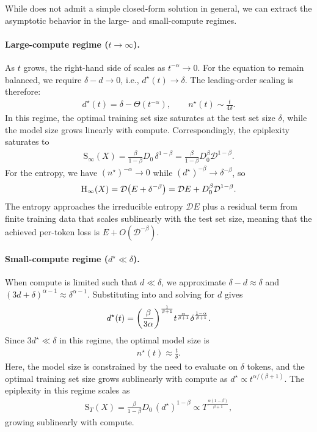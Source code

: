 \documentclass[twoside]{article}
\newcommand{\D}{\mathcal{D}}
\newcommand{\rH}{\mathrm{H}}
\newcommand{\rS}{\mathrm{S}}
\begin{document}
While  does not admit a simple closed-form solution in general, we can extract the asymptotic behavior in the large- and small-compute regimes.

\paragraph{Large-compute regime ($t \to \infty$).} As $t$ grows, the right-hand side of  scales as $t^{-\alpha} \to 0$. For the equation to remain balanced, we require $\delta - d \to 0$, i.e., $d^\star(t) \to \delta$. The leading-order scaling is therefore:
\begin{align}
    d^\star(t) = \delta - \Theta(t^{-\alpha}), \qquad n^\star(t) \sim \frac{t}{4\delta}.
\end{align}
In this regime, the optimal training set size saturates at the test set size $\delta$, while the model size grows linearly with compute. Correspondingly, the epiplexity saturates to
\begin{align}
    \rS_\infty(X) = \frac{\beta}{1-\beta} D_0 \, \delta^{1-\beta} = \frac{\beta}{1-\beta} D_0^{\beta} \mathcal{D}^{1-\beta}.
\end{align}
For the entropy, we have $(n^\star)^{-\alpha} \to 0$ while $(d^\star)^{-\beta} \to \delta^{-\beta}$, so
\begin{align}
    \rH_\infty(X) = \mathcal{D} \qty( E + \delta^{-\beta} ) = \mathcal{D} E + D_0^{\beta} \mathcal{D}^{1-\beta}.
\end{align}
The entropy approaches the irreducible entropy $\mathcal{D} E$ plus a residual term from finite training data that scales sublinearly with the test set size, meaning that the achieved per-token loss is $E + O(\D^{-\beta}).$

\paragraph{Small-compute regime ($d^\star \ll \delta$).} When compute is limited such that $d \ll \delta$, we approximate $\delta - d \approx \delta$ and $(3d + \delta)^{\alpha-1} \approx \delta^{\alpha-1}$. Substituting into  and solving for $d$ gives
\begin{align}
    d^\star(t) = \qty( \frac{\beta}{3\alpha} )^{\frac{1}{\beta+1}} t^{\frac{\alpha}{\beta+1}} \delta^{\frac{1-\alpha}{\beta+1}}.
\end{align}
Since $3d^\star \ll \delta$ in this regime, the optimal model size is
\begin{align}
    n^\star(t) \approx \frac{t}{\delta}.
\end{align}
Here, the model size is constrained by the need to evaluate on $\delta$ tokens, and the optimal training set size grows sublinearly with compute as $d^\star \propto t^{\alpha/(\beta+1)}$. The epiplexity in this regime scales as
\begin{align}
    \rS_T(X) = \frac{\beta}{1-\beta} D_0 \, (d^\star)^{1-\beta} \propto T^{\frac{\alpha(1-\beta)}{\beta+1}},
\end{align}
growing sublinearly with compute.
\end{document}
